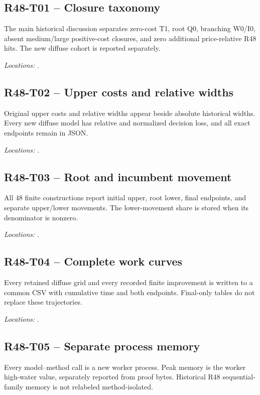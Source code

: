 \subsection{R48-T01 -- Closure taxonomy}
The main historical discussion separates zero-cost T1, root Q0, branching W0/I0, absent medium/large positive-cost closures, and zero additional price-relative R48 hits. The new diffuse cohort is reported separately.

\noindent\emph{Locations:} .

\subsection{R48-T02 -- Upper costs and relative widths}
Original upper costs and relative widths appear beside absolute historical widths. Every new diffuse model has relative and normalized decision loss, and all exact endpoints remain in JSON.

\noindent\emph{Locations:} .

\subsection{R48-T03 -- Root and incumbent movement}
All 48 finite constructions report initial upper, root lower, final endpoints, and separate upper/lower movements. The lower-movement share is stored when its denominator is nonzero.

\noindent\emph{Locations:} .

\subsection{R48-T04 -- Complete work curves}
Every retained diffuse grid and every recorded finite improvement is written to a common CSV with cumulative time and both endpoints. Final-only tables do not replace these trajectories.

\noindent\emph{Locations:} .

\subsection{R48-T05 -- Separate process memory}
Every model--method call is a new worker process. Peak memory is the worker high-water value, separately reported from proof bytes. Historical R48 sequential-family memory is not relabeled method-isolated.

